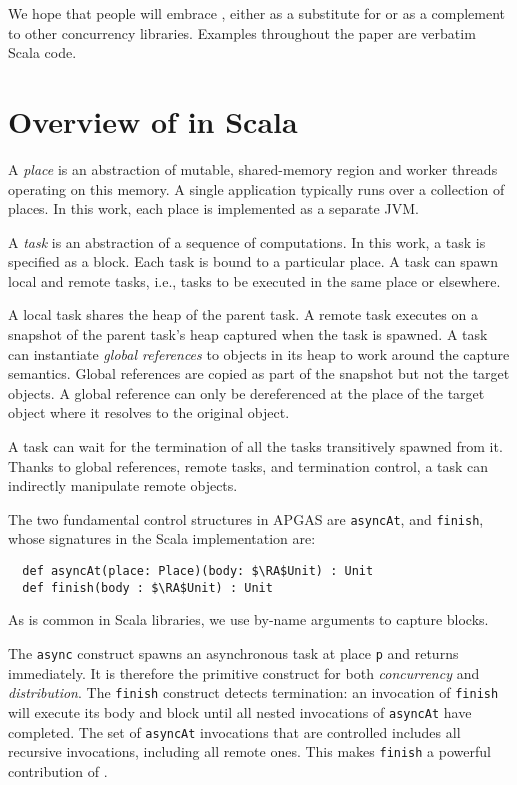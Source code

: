 We hope that people will embrace \apgas, either as a substitute for or as a
complement to other concurrency libraries. Examples throughout the paper are
verbatim Scala \apgas code. 


\section{Overview of \apgas in Scala}
\label{sec:apgas}

A {\em place} is an abstraction of mutable, shared-memory region and worker threads operating on this memory.
A single application typically runs over a collection of places. In this work, each place is implemented as a separate JVM.

A {\em task} is an abstraction of a sequence of computations. In this work, a task is specified as a block.
Each task is bound to a particular place. 
A task can spawn local and remote tasks, i.e., tasks to be executed in the same place or elsewhere.

A local task shares the heap of the parent task. A remote task executes on a snapshot of the parent task's heap captured when the task is spawned. A task can instantiate \emph{global references} to objects in its heap to work around the capture semantics.
Global references are copied as part of the snapshot but not the target objects. A global reference can only be dereferenced
at the place of the target object where it resolves to the original object.

A task can wait for the termination of all the tasks transitively spawned from it.
Thanks to global references, remote tasks, and termination control,
a task can indirectly manipulate remote objects.

The two fundamental control structures in APGAS are
 \lstinline{asyncAt}, and \lstinline{finish}, whose signatures in
the Scala implementation are:
\begin{lstlisting}
  def asyncAt(place: Place)(body: $\RA$Unit) : Unit
  def finish(body : $\RA$Unit) : Unit
\end{lstlisting}
As is common in Scala libraries, we use by-name arguments to capture blocks.

The \lstinline{async} construct spawns an asynchronous task at place \lstinline{p} and returns
immediately. It is therefore the primitive construct for both \emph{concurrency} and \emph{distribution}.
The \lstinline{finish} construct detects termination: an invocation of
\lstinline{finish} will execute its body and block until all nested invocations
of \lstinline{asyncAt} have completed. The set of \lstinline{asyncAt} invocations
that are controlled includes all recursive invocations, including all remote
ones. This makes \lstinline{finish} a powerful contribution of \apgas.

